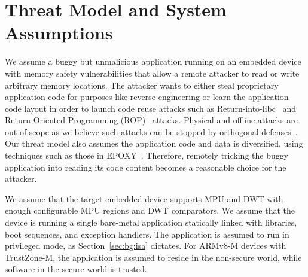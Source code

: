 \section{Threat Model and System Assumptions}
\label{sec:threat}

We assume a buggy but unmalicious application running on an embedded
device with memory safety vulnerabilities that allow a
remote attacker to read or write arbitrary memory locations.  The
attacker wants to either steal proprietary application code
for purposes like reverse engineering or learn the application code
layout in order to launch code reuse attacks such as
Return-into-libc~\cite{Ret2Libc:RAID11}
and
Return-Oriented Programming (ROP)~\cite{ROP:TOISS12} attacks.
Physical and offline attacks are
out of scope as we believe such attacks can be stopped by orthogonal
defenses~\cite{IoT:DAC15,IoTSec:CN18}.
Our threat model also assumes the application code and data is
diversified, using techniques such as those in
EPOXY~\cite{EPOXY:Oakland17}.  Therefore, remotely tricking the buggy
application into reading its code content becomes a reasonable choice
for the attacker.

We assume that the target embedded device supports MPU
and DWT with enough configurable MPU regions and DWT comparators.  We
assume that the device is running a single bare-metal application
statically linked with libraries, boot sequences, and exception
handlers.  The application is assumed to run in privileged mode, as
Section~\ref{sec:bg:isa} dictates.  For ARMv8-M devices with TrustZone-M,
the application is assumed to reside in the non-secure world, while
software in the secure world is trusted.
